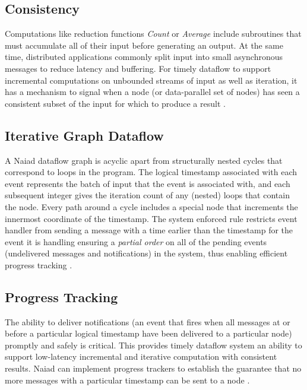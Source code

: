 \documentclass[9pt,twocolumn,twoside]{../../styles/osajnl}
\begin{document}
\subsection{Consistency}
Computations like reduction functions \textit{Count} or
\textit{Average} include subroutines that must accumulate all of their
input before generating an output. At the same time, distributed
applications commonly split input into small asynchronous messages to
reduce latency and buffering. For timely dataflow to support
incremental computations on unbounded streams of input as well as
iteration, it has a mechanism to signal when a node (or data-parallel
set of nodes) has seen a consistent subset of the input for which to
produce a result \cite{paper3-Naiad}.

\subsection{Iterative Graph Dataflow}
A Naiad dataflow graph is acyclic apart from structurally nested
cycles that correspond to loops in the program. The logical timestamp
associated with each event represents the batch of input that the
event is associated with, and each subsequent integer gives the
iteration count of any (nested) loops that contain the node. Every
path around a cycle includes a special node that increments the
innermost coordinate of the timestamp.  The system enforced rule
restricts event handler from sending a message with a time earlier
than the timestamp for the event it is handling ensuring a
\textit{partial order} on all of the pending events (undelivered
messages and notifications) in the system, thus enabling efficient
progress tracking \cite{paper1-Naiad}.

\subsection{Progress Tracking}
The ability to deliver notifications (an event that fires when all
messages at or before a particular logical timestamp have been
delivered to a particular node) promptly and safely is critical. This
provides timely dataflow system an ability to support low-latency
incremental and iterative computation with consistent results. Naiad
can implement progress trackers to establish the guarantee that no
more messages with a particular timestamp can be sent to a node
\cite{paper1-Naiad}.
\end{document}
